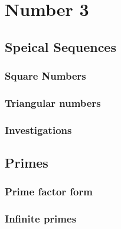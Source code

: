 \chapter{Number 3}
\section{Speical Sequences}
\subsection{Square Numbers}
\subsection{Triangular numbers}
\subsection{Investigations}
\section{Primes}
\subsection{Prime factor form}
\subsection{Infinite primes}
